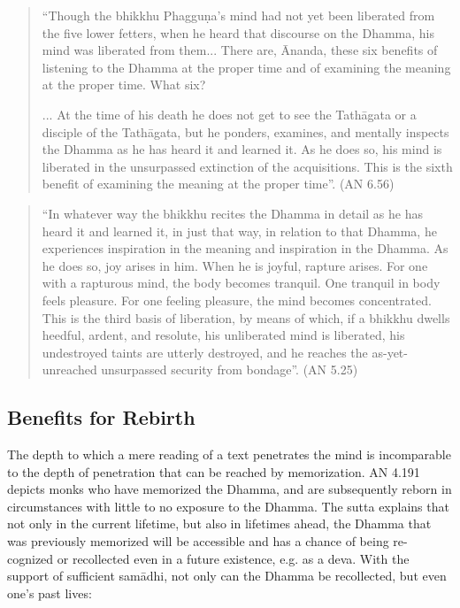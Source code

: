 \begin{quote}
  ``Though the bhikkhu Phagguṇa's mind had not yet been liberated from the five lower fetters, when he heard that discourse on the Dhamma, his mind was liberated from them... There are, Ānanda, these six benefits of listening to the Dhamma at the proper time and of examining the meaning at the proper time. What six?

  ... At the time of his death he does not get to see the Tathāgata or a disciple of the Tathāgata, but he ponders, examines, and mentally inspects the Dhamma as he has heard it and learned it. As he does so, his mind is liberated in the unsurpassed extinction of the acquisitions. This is the sixth benefit of examining the meaning at the proper time''. (AN 6.56)
\end{quote}

\begin{quote}
  ``In whatever way the bhikkhu recites the Dhamma in detail as he has heard it and learned it, in just that way, in relation to that Dhamma, he experiences inspiration in the meaning and inspiration in the Dhamma. As he does so, joy arises in him. When he is joyful, rapture arises. For one with a rapturous mind, the body becomes tranquil. One tranquil in body feels pleasure. For one feeling pleasure, the mind becomes concentrated. This is the third basis of liberation, by means of which, if a bhikkhu dwells heedful, ardent, and resolute, his unliberated mind is liberated, his undestroyed taints are utterly destroyed, and he reaches the as-yet-unreached unsurpassed security from bondage''. (AN 5.25)
\end{quote}

\subsection*{Benefits for Rebirth}

The depth to which a mere reading of a text penetrates the mind is incomparable to the depth of penetration that can be reached by memorization. AN 4.191 depicts monks who have memorized the Dhamma, and are subsequently reborn in circumstances with little to no exposure to the Dhamma. The sutta explains that not only in the current lifetime, but also in lifetimes ahead, the Dhamma that was previously memorized will be accessible and has a chance of being re-cognized or recollected even in a future existence, e.g. as a deva. With the support of sufficient samādhi, not only can the Dhamma be recollected, but even one's past lives:


